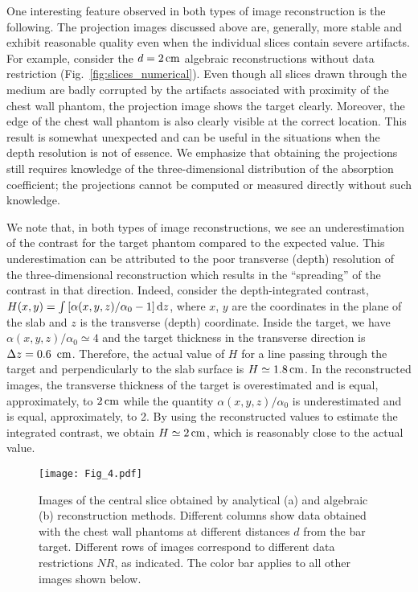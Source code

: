 One interesting feature observed in both types of image reconstruction is the following. The projection images discussed above are, generally, more stable and exhibit reasonable quality even when the
individual slices contain severe artifacts. For example, consider the $d=2\,{\rm cm}$ algebraic reconstructions without data restriction (Fig.~\ref{fig:slices_numerical}). Even though all slices drawn
through the medium are badly corrupted by the artifacts associated with proximity of the chest wall phantom, the projection image shows the target clearly. Moreover, the edge of the chest wall phantom is
also clearly visible at the correct location. This result is somewhat unexpected and can be useful in the situations when the depth resolution is not of essence. We emphasize that obtaining the projections still requires knowledge of the three-dimensional distribution of the absorption coefficient; the projections cannot be computed or measured directly without such knowledge.

We note that, in both types of image reconstructions, we see an underestimation of the contrast for the target phantom compared to the expected value. This underestimation can be attributed to the poor
transverse (depth) resolution of the three-dimensional reconstruction which results in the ``spreading'' of the contrast in that direction. Indeed, consider the depth-integrated contrast, $H(x,y) = \int \left[
  \alpha(x,y,z) / \alpha_0 - 1 \right] {\rm d}z$, where $x$, $y$ are the coordinates in the plane of the slab and $z$ is the transverse (depth) coordinate. Inside the target, we have $\alpha(x,y,z) /
\alpha_0 \simeq 4$ and the target thickness in the transverse direction is $\Delta z=0.6\,\ {\rm cm}$. Therefore, the actual value of $H$ for a line passing through the target and perpendicularly to
the slab surface is $H\simeq 1.8\,{\rm cm}$. In the reconstructed images, the transverse thickness of the target is overestimated and is equal, approximately, to $2\,{\rm cm}$ while the quantity
$\alpha(x,y,z)/\alpha_0$ is underestimated and is equal, approximately, to 2. By using the reconstructed values to estimate the integrated contrast, we obtain $H\simeq 2\,{\rm cm}$, which is
reasonably close to the actual value.

\begin{figure}[htbp]
\begin{center}
\begin{minipage}[h]{1\textwidth}
\begin{center}
\texttt{[image: Fig\_4.pdf]}
\end{center}
\end{minipage}
\end{center}
\caption{\label{fig:central}
Images of the central slice obtained by analytical (a) and algebraic (b) reconstruction methods. Different columns show data obtained with the chest wall phantoms at different distances $d$ from the bar
target.  Different rows of images correspond to different data restrictions $NR$, as indicated.  The color bar applies to all other images shown below.}
\end{figure}


